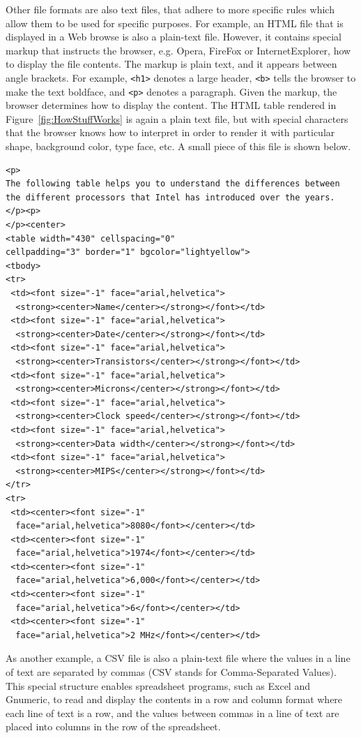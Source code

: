 Other file formats are also text files, that adhere to more specific
rules which allow them to be used for specific purposes.  For example,
an HTML file that is displayed in a Web browse is also a plain-text
file.  However, it contains special markup that instructs the browser,
e.g.  Opera, FireFox or InternetExplorer, how to display the file
contents.  The markup is plain text, and it appears between angle
brackets.  For example, \verb+<h1>+ denotes a large header, \verb+<b>+
tells the browser to make the text boldface, and \verb+<p>+ denotes a
paragraph.  Given the markup, the browser determines how to display
the content. The HTML table rendered in Figure~\ref{fig:HowStuffWorks}
is again a plain text file, but with special characters that the
browser knows how to interpret in order to render it with particular
shape, background color, type face, etc.  A small piece of this file
is shown below.

{\footnotesize{
\begin{verbatim}
<p>
The following table helps you to understand the differences between 
the different processors that Intel has introduced over the years.
</p><p>
</p><center>
<table width="430" cellspacing="0" 
cellpadding="3" border="1" bgcolor="lightyellow">
<tbody>
<tr>
 <td><font size="-1" face="arial,helvetica">
  <strong><center>Name</center></strong></font></td>
 <td><font size="-1" face="arial,helvetica">
  <strong><center>Date</center></strong></font></td>
 <td><font size="-1" face="arial,helvetica">
  <strong><center>Transistors</center></strong></font></td>
 <td><font size="-1" face="arial,helvetica">
  <strong><center>Microns</center></strong></font></td>
 <td><font size="-1" face="arial,helvetica">
  <strong><center>Clock speed</center></strong></font></td>
 <td><font size="-1" face="arial,helvetica">
  <strong><center>Data width</center></strong></font></td>
 <td><font size="-1" face="arial,helvetica">
  <strong><center>MIPS</center></strong></font></td>
</tr>
<tr>
 <td><center><font size="-1"
  face="arial,helvetica">8080</font></center></td>
 <td><center><font size="-1"
  face="arial,helvetica">1974</font></center></td>
 <td><center><font size="-1"
  face="arial,helvetica">6,000</font></center></td>
 <td><center><font size="-1"
  face="arial,helvetica">6</font></center></td>
 <td><center><font size="-1" 
  face="arial,helvetica">2 MHz</font></center></td>
\end{verbatim}
}}

As another example, a CSV file is also a plain-text file where the
values in a line of text are separated by commas (CSV stands for
Comma-Separated Values). This special structure enables spreadsheet
programs, such as Excel and Gnumeric, to read and display the contents
in a row and column format where each line of text is a row, and the
values between commas in a line of text are placed into columns in the
row of the spreadsheet.

